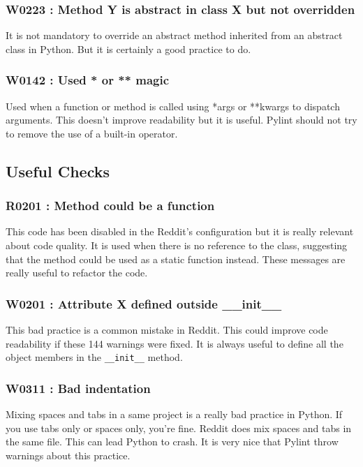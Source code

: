 \documentclass[12pt, a4paper]{article}
\newcommand{\pyl}{\textsf{Pylint}}
\begin{document}
\medskip
\subsubsection*{W0223 : Method Y is abstract in class X but not overridden}

It is not mandatory to override an abstract method inherited from an abstract class in Python.
But it is certainly a good practice to do.

\medskip
\subsubsection*{W0142 : Used * or ** magic}

Used when a function or method is called using *args or **kwargs to dispatch arguments. 
This doesn't improve readability but it is useful.
\pyl{} should not try to remove the use of a built-in operator.

\newpage
\subsection*{Useful Checks}

\subsubsection*{R0201 : Method could be a function}

This code has been disabled in the Reddit's configuration but it is really relevant about code quality. 
It is used when there is no reference to the class, suggesting that the method could be used as a static function instead.
These messages are really useful to refactor the code.

\medskip
\subsubsection*{W0201 : Attribute X defined outside \_\_init\_\_}

This bad practice is a common mistake in Reddit.
This could improve code readability if these 144 warnings were fixed.
It is always useful to define all the object members in the \lstinline|__init__| method.

\medskip
\subsubsection*{W0311 : Bad indentation}

Mixing spaces and tabs in a same project is a really bad practice in Python.
If you use tabs only or spaces only, you're fine.
Reddit does mix spaces and tabs in the same file.
This can lead Python to crash.
It is very nice that \pyl{} throw warnings about this practice.
\end{document}
